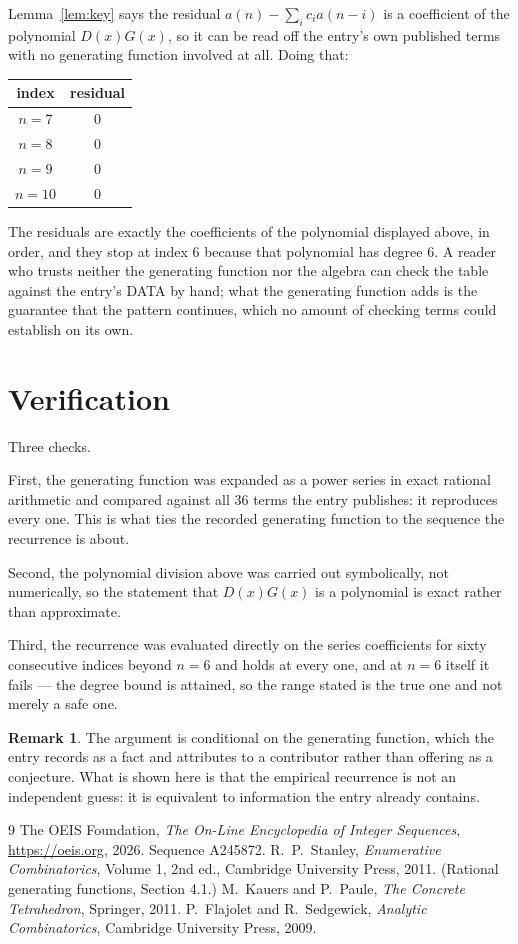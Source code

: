 \documentclass[11pt,a4paper]{article}
\theoremstyle{plain}
\theoremstyle{definition}
\newtheorem{remark}[theorem]{Remark}
\begin{document}
Lemma~\ref{lem:key} says the residual $a(n)-\sum_ic_ia(n-i)$ is a coefficient of the
polynomial $D(x)G(x)$, so it can be read off the entry's own published terms with no
generating function involved at all. Doing that:
\begin{center}
\begin{tabular}{cc}
index & residual \\ \hline
$n=7$ & $0$ \\
$n=8$ & $0$ \\
$n=9$ & $0$ \\
$n=10$ & $0$
\end{tabular}
\end{center}
The residuals are exactly the coefficients of the polynomial displayed above, in order, and
they stop at index $6$ because that polynomial has degree $6$. A reader who trusts
neither the generating function nor the algebra can check the table against the entry's DATA
by hand; what the generating function adds is the guarantee that the pattern continues, which
no amount of checking terms could establish on its own.

\section{Verification}

Three checks.

First, the generating function was expanded as a power series in exact rational arithmetic and
compared against all $36$ terms the entry publishes: it reproduces every one. This is
what ties the recorded generating function to the sequence the recurrence is about.

Second, the polynomial division above was carried out symbolically, not numerically, so the
statement that $D(x)G(x)$ is a polynomial is exact rather than approximate.

Third, the recurrence was evaluated directly on the series coefficients for sixty consecutive
indices beyond $n=6$ and holds at every one, and at $n=6$ itself it fails --- the
degree bound is attained, so the range stated is the true one and not merely a safe one.

\begin{remark}
The argument is conditional on the generating function, which the entry records as a fact and
attributes to a contributor rather than offering as a conjecture. What is shown here is that
the empirical recurrence is not an independent guess: it is equivalent to information the
entry already contains.
\end{remark}

\begin{thebibliography}{9}
 The OEIS Foundation, \emph{The On-Line Encyclopedia of Integer
Sequences}, \url{https://oeis.org}, 2026. Sequence A245872.
 R.~P.~Stanley, \emph{Enumerative Combinatorics}, Volume 1, 2nd ed.,
Cambridge University Press, 2011. (Rational generating functions, Section 4.1.)
 M.~Kauers and P.~Paule, \emph{The Concrete Tetrahedron}, Springer, 2011.
 P.~Flajolet and R.~Sedgewick, \emph{Analytic Combinatorics}, Cambridge
University Press, 2009.
\end{thebibliography}
\end{document}
